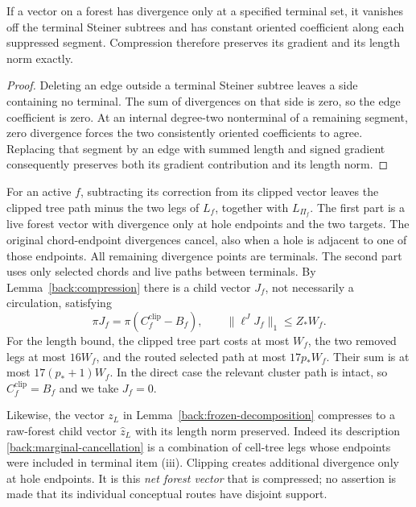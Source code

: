 \begin{lemma}
\label{back:compression}
If a vector on a forest has divergence only at a specified terminal
set, it vanishes off the terminal Steiner subtrees and has constant
oriented coefficient along each suppressed segment.  Compression
therefore preserves its gradient and its length norm exactly.
\end{lemma}

\begin{proof}
Deleting an edge outside a terminal Steiner subtree leaves a side
containing no terminal.  The sum of divergences on that side is zero,
so the edge coefficient is zero.  At an internal degree-two
nonterminal of a remaining segment, zero divergence forces the two
consistently oriented coefficients to agree.  Replacing that segment
by an edge with summed length and signed gradient consequently
preserves both its gradient contribution and its length norm.
\end{proof}

For an active $f$, subtracting its correction from its clipped vector
leaves the clipped tree path minus the two legs of $L_f$, together
with $L_{\Pi_f}$.  The first part is a live forest vector with
divergence only at hole endpoints and the two targets.  The original
chord-endpoint divergences cancel, also when a hole is adjacent to
one of those endpoints.  All remaining divergence points are
terminals.  The second part uses only selected chords and live paths
between terminals.  By Lemma~\ref{back:compression} there is a child
vector $J_f$, not necessarily a circulation, satisfying
\begin{equation}
\label{back:remainder}
 \pi J_f=\pi(C_f^{\mathrm{clip}}-B_f),\qquad
                    \|\ell^J J_f\|_1\le Z_*W_f.
\end{equation}
For the length bound, the clipped tree part costs at most $W_f$,
the two removed legs at most $16W_f$, and the routed selected path
at most $17p_*W_f$.  Their sum is at most
$17(p_*+1)W_f$.  In the direct case the relevant cluster path is
intact, so $C_f^{\mathrm{clip}}=B_f$ and we take $J_f=0$.

Likewise, the vector $z_L$ in
Lemma~\ref{back:frozen-decomposition} compresses to a raw-forest child
vector $\widehat z_L$ with its length norm preserved.  Indeed its
description \eqref{back:marginal-cancellation} is a combination of
cell-tree legs whose endpoints were included in terminal item (iii).
Clipping creates additional divergence only at hole endpoints.
It is this \emph{net forest vector} that is compressed; no assertion
is made that its individual conceptual routes have disjoint support.

